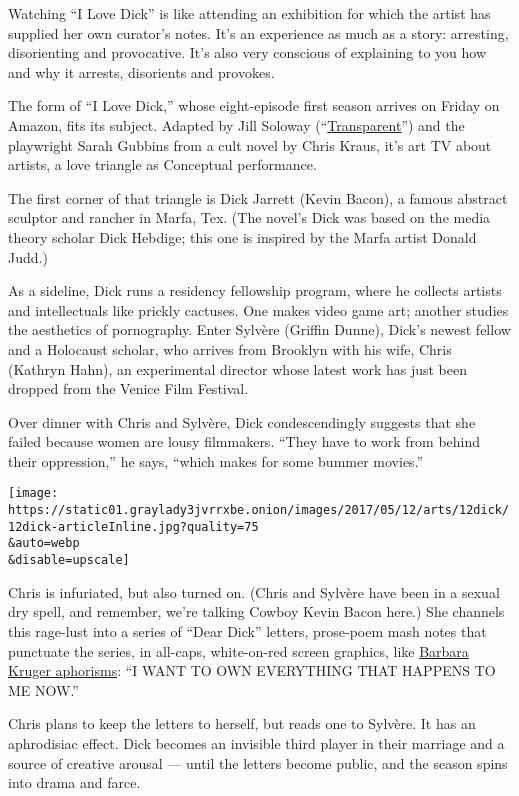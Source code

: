 Watching ``I Love Dick'' is like attending an exhibition for which the
artist has supplied her own curator's notes. It's an experience as much
as a story: arresting, disorienting and provocative. It's also very
conscious of explaining to you how and why it arrests, disorients and
provokes.

The form of ``I Love Dick,'' whose eight-episode first season arrives on
Friday on Amazon, fits its subject. Adapted by Jill Soloway
(``\href{https://www.nytimes3xbfgragh.onion/watching/recommendations/watching-tv-transparent?auto=true}{Transparent}'')
and the playwright Sarah Gubbins from a cult novel by Chris Kraus, it's
art TV about artists, a love triangle as Conceptual performance.

The first corner of that triangle is Dick Jarrett (Kevin Bacon), a
famous abstract sculptor and rancher in Marfa, Tex. (The novel's Dick
was based on the media theory scholar Dick Hebdige; this one is inspired
by the Marfa artist Donald Judd.)

As a sideline, Dick runs a residency fellowship program, where he
collects artists and intellectuals like prickly cactuses. One makes
video game art; another studies the aesthetics of pornography. Enter
Sylvère (Griffin Dunne), Dick's newest fellow and a Holocaust scholar,
who arrives from Brooklyn with his wife, Chris (Kathryn Hahn), an
experimental director whose latest work has just been dropped from the
Venice Film Festival.

Over dinner with Chris and Sylvère, Dick condescendingly suggests that
she failed because women are lousy filmmakers. ``They have to work from
behind their oppression,'' he says, ``which makes for some bummer
movies.''

\texttt{[image: https://static01.graylady3jvrrxbe.onion/images/2017/05/12/arts/12dick/12dick-articleInline.jpg?quality=75\\\&auto=webp\\\&disable=upscale]}

Chris is infuriated, but also turned on. (Chris and Sylvère have been in
a sexual dry spell, and remember, we're talking Cowboy Kevin Bacon
here.) She channels this rage-lust into a series of ``Dear Dick''
letters, prose-poem mash notes that punctuate the series, in all-caps,
white-on-red screen graphics, like
\href{http://www.nytimes3xbfgragh.onion/slideshow/2017/02/13/t-magazine/the-pictures-generations-greatest-hits/s/pictures-generation-slide-MYOG.html}{Barbara
Kruger aphorisms}: ``I WANT TO OWN EVERYTHING THAT HAPPENS TO ME NOW.''

Chris plans to keep the letters to herself, but reads one to Sylvère. It
has an aphrodisiac effect. Dick becomes an invisible third player in
their marriage and a source of creative arousal --- until the letters
become public, and the season spins into drama and farce.

